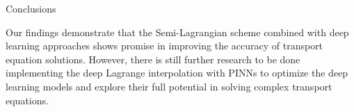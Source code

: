 \begin{frame}{Conclusions}
    
    Our findings demonstrate that the Semi-Lagrangian scheme combined with deep learning approaches shows promise in improving the accuracy of transport equation solutions. 
    However, there is still further research to be done implementing the deep Lagrange interpolation with PINNs to optimize the deep learning models and explore their full 
    potential in solving complex transport equations.
    

\end{frame}